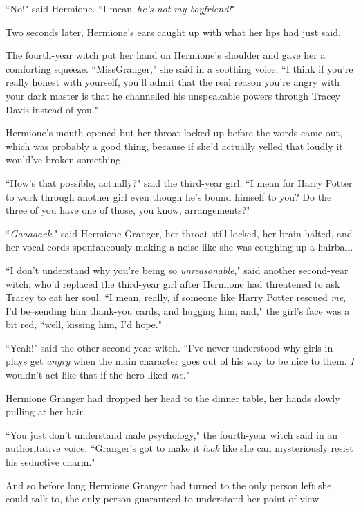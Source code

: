 ``No!" said Hermione. ``I mean\---\emph{he's not my boyfriend!}"

Two seconds later, Hermione's ears caught up with what her lips had just said.

The fourth-year witch put her hand on Hermione's shoulder and gave her a comforting squeeze. ``Miss\?Granger," she said in a soothing voice, ``I think if you're really honest with yourself, you'll admit that the real reason you're angry with your dark master is that he channelled his unspeakable powers through Tracey Davis instead of you."

Hermione's mouth opened but her throat locked up before the words came out, which was probably a good thing, because if she'd actually yelled that loudly it would've broken something.

``How's that possible, actually?" said the third-year girl. ``I mean for Harry Potter to work through another girl even though he's bound himself to you? Do the three of you have one of those, you know, arrangements?"

``\emph{Gaaaaack}," said Hermione Granger, her throat still locked, her brain halted, and her vocal cords spontaneously making a noise like she was coughing up a hairball.


``I don't understand why you're being so \emph{unreasonable}," said another second-year witch, who'd replaced the third-year girl after Hermione had threatened to ask Tracey to eat her soul. ``I mean, really, if someone like Harry Potter rescued \emph{me}, I'd be\---sending him thank-you cards, and hugging him, and," the girl's face was a bit red, ``well, kissing him, I'd hope."

``Yeah!" said the other second-year witch. ``I've never understood why girls in plays get \emph{angry} when the main character goes out of his way to be nice to them. \emph{I} wouldn't act like that if the hero liked \emph{me}."

Hermione Granger had dropped her head to the dinner table, her hands slowly pulling at her hair.

``You just don't understand male psychology," the fourth-year witch said in an authoritative voice. ``Granger's got to make it \emph{look} like she can mysteriously resist his seductive charm."


And so before long Hermione Granger had turned to the only person left she could talk to, the only person guaranteed to understand her point of view\---

